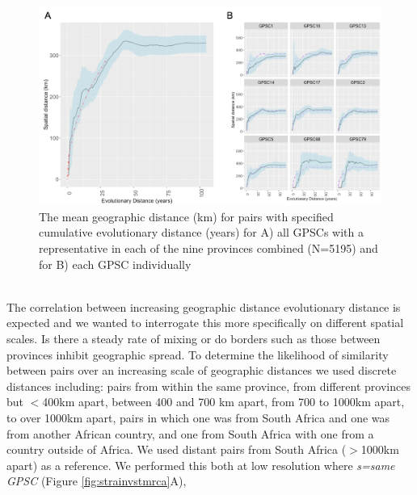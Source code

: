 \documentclass{article}
\begin{document}
\begin{figure}[H]
\centering
    \includegraphics[width=\textwidth]{transrate_AB.png}
    \caption{The mean geographic distance (km) for pairs with specified cumulative evolutionary distance (years) for A) all GPSCs with a representative in each of the nine provinces combined (N=5195) and for B) each GPSC individually}
      \label{fig:transrate}
\end{figure}
\\The correlation between increasing geographic distance evolutionary distance is expected and we wanted to interrogate this more specifically on different spatial scales. Is there a steady rate of mixing or do borders such as those between provinces inhibit geographic spread. To determine the likelihood of similarity between pairs over an increasing scale of geographic distances we used discrete distances including: pairs from within the same province, from different provinces but $<$400km apart, between 400 and 700 km apart, from 700 to 1000km apart, to over 1000km apart, pairs in which one was from South Africa and one was from another African country, and one from South Africa with one from a country outside of Africa. We used distant pairs from South Africa ($>$1000km apart) as a reference. We performed this both at low resolution where \textit{s=same GPSC} (Figure \ref{fig:strainvstmrca}A),
\end{document}
